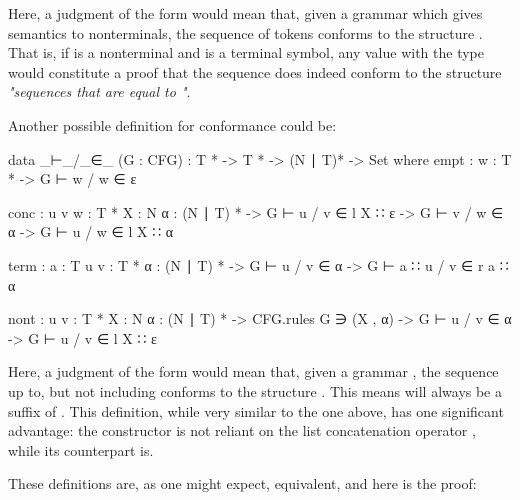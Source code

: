 	Here, a judgment of the form  would mean that, given a
	grammar  which gives semantics to nonterminals, the sequence of
	tokens  conforms to the structure . That is, if
	 is a nonterminal and  is a terminal symbol, any value
	with the type  would constitute a proof
	that the sequence  does indeed conform to the structure
	\emph{"sequences that are equal to "}.

	Another possible definition for conformance could be: 

	\begin{code}
	
		data _⊢_/_∈_ (G : CFG) : T * -> T * -> (N ∣ T)* -> Set where
		  empt : {w : T *} ->
		    G ⊢ w / w ∈ ε
		
		  conc : {u v w : T *} {X : N} {α : (N ∣ T) *} ->
		    G ⊢ u / v ∈ l X ∷ ε ->
		    G ⊢ v / w ∈ α ->
		      G ⊢ u / w ∈ l X ∷ α
		
		  term : {a : T} {u v : T *} {α : (N ∣ T) *} ->
		    G ⊢ u / v ∈ α ->
		      G ⊢ a ∷ u / v ∈ r a ∷ α
		
		  nont : {u v : T *} {X : N} {α : (N ∣ T) *} ->
		    CFG.rules G ∋ (X , α) ->
		    G ⊢ u / v ∈ α ->
		    G ⊢ u / v ∈ l X ∷ ε

	\end{code}

	Here, a judgment of the form  would mean that, given
	a grammar , the sequence  up to, but not including 
	 conforms to the structure . This means  will
	always be a suffix of . This definition, while very similar to 
	the one above, has one significant advantage: the constructor 
	 is not reliant on the list concatenation operator 
	\codett{++}, while its counterpart  is.

	These definitions are, as one might expect, equivalent, and here is the 
	proof:

	\begin{code}
	
	\end{code}


